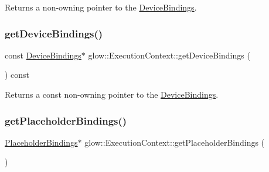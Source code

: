 \begin{DoxyReturn}{Returns}
a non-\/owning pointer to the \hyperlink{classglow_1_1_device_bindings}{Device\+Bindings}. 
\end{DoxyReturn}
\mbox{\label{classglow_1_1_execution_context_ad618b65cd4698dbe9bac4e442e0c8750}} 
\subsubsection{\texorpdfstring{get\+Device\+Bindings()}{getDeviceBindings()}\hspace{0.1cm}{\footnotesize\ttfamily [2/2]}}
{\footnotesize\ttfamily const \hyperlink{classglow_1_1_device_bindings}{Device\+Bindings}$\ast$ glow\+::\+Execution\+Context\+::get\+Device\+Bindings (\begin{DoxyParamCaption}{ }\end{DoxyParamCaption}) const\hspace{0.3cm}{\ttfamily [inline]}}

\begin{DoxyReturn}{Returns}
a const non-\/owning pointer to the \hyperlink{classglow_1_1_device_bindings}{Device\+Bindings}. 
\end{DoxyReturn}
\mbox{\label{classglow_1_1_execution_context_a12a98468e7e9884864da752c7bf14c40}} 
\subsubsection{\texorpdfstring{get\+Placeholder\+Bindings()}{getPlaceholderBindings()}\hspace{0.1cm}{\footnotesize\ttfamily [1/2]}}
{\footnotesize\ttfamily \hyperlink{classglow_1_1_placeholder_bindings}{Placeholder\+Bindings}$\ast$ glow\+::\+Execution\+Context\+::get\+Placeholder\+Bindings (\begin{DoxyParamCaption}{ }\end{DoxyParamCaption})\hspace{0.3cm}{\ttfamily [inline]}}

